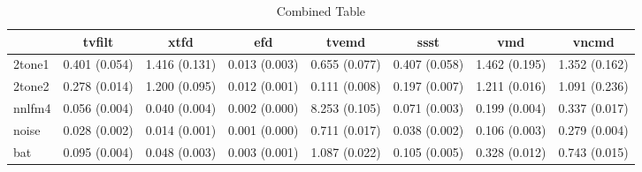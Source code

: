 \documentclass{article}
\begin{document}
\begin{table}
    \centering
    \begin{tabular}{lccccccc}
        \toprule
        & \multicolumn{1}{c}{tvfilt} & \multicolumn{1}{c}{xtfd} & \multicolumn{1}{c}{efd} & \multicolumn{1}{c}{tvemd} & \multicolumn{1}{c}{ssst} & \multicolumn{1}{c}{vmd} & \multicolumn{1}{c}{vncmd} \\
        \midrule
        2tone1 & 0.401 (0.054) & 1.416 (0.131) & 0.013 (0.003) & 0.655 (0.077) & 0.407 (0.058) & 1.462 (0.195) & 1.352 (0.162) \\
        2tone2 & 0.278 (0.014) & 1.200 (0.095) & 0.012 (0.001) & 0.111 (0.008) & 0.197 (0.007) & 1.211 (0.016) & 1.091 (0.236) \\
        nnlfm4 & 0.056 (0.004) & 0.040 (0.004) & 0.002 (0.000) & 8.253 (0.105) & 0.071 (0.003) & 0.199 (0.004) & 0.337 (0.017) \\
        noise & 0.028 (0.002) & 0.014 (0.001) & 0.001 (0.000) & 0.711 (0.017) & 0.038 (0.002) & 0.106 (0.003) & 0.279 (0.004) \\
        bat   & 0.095 (0.004) & 0.048 (0.003) & 0.003 (0.001) & 1.087 (0.022) & 0.105 (0.005) & 0.328 (0.012) & 0.743 (0.015) \\
        \bottomrule
    \end{tabular}
    \caption{Combined Table}
    \label{tab:combined}
\end{table}
\end{document}
